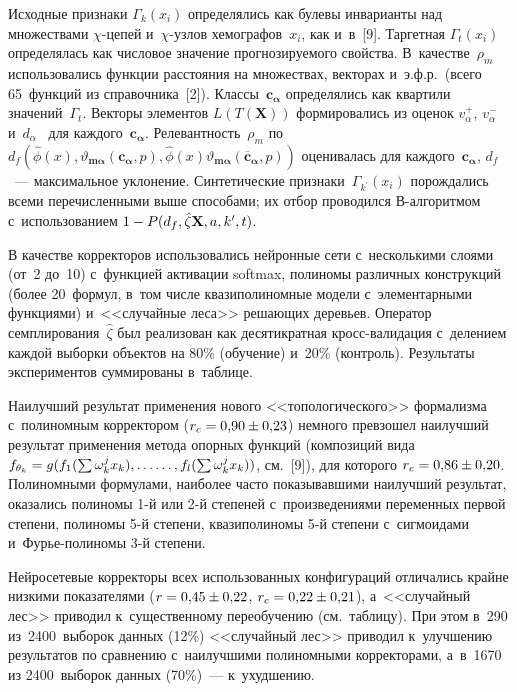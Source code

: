 \begin{multicols}{2}
     Исходные признаки $\Gamma_k(x_i)$ определялись как булевы 
инварианты над множествами $\chi$-це\-пей и~$\chi$-уз\-лов 
хемографов~$x_i$, как и~в~[9]. Таргетная $\Gamma_t(x_i)$ определялась как 
числовое значение прогнозируемого свойства. В~качестве~$\rho_m$ 
использовались функции расстояния на множествах, векторах и~э.ф.р.\ (всего 
65~функций из справочника~[2]). Классы~$\mathbf{c}_{\bm{\alpha}}$ 
определялись как квартили значений~$\Gamma_t$. Векторы элементов 
$L(T(\mathbf{X}))$ формировались из оценок $v^+_\alpha$, $v^-_\alpha$ 
и~$d_\alpha$~\cite{4-tor} для каждого~$\mathbf{c}_{\bm{\alpha}}$. 
Релевантность~$\rho_m$ по $d_f(\hat{\phi}(x),\vartheta_{\mathbf{m}{\bm 
\alpha}}(\mathbf{c}_{\bm{\alpha}},{p}), 
\hat{\phi}(x)\vartheta_{\mathbf{m}{\bm \alpha}} 
(\overline{\mathbf{c}}_{\bm{\alpha}}, {p}))$ оценивалась для 
каждого~$\mathbf{c}_{\bm{\alpha}}$, $d_f$~--- максимальное уклонение. 
Синтетические признаки~$\Gamma_{k^\prime}(x_i)$ по\-рож\-да\-лись всеми 
перечисленными выше способами; их отбор проводился В-ал\-го\-рит\-мом 
с~использованием $1\hm- {P}(d_f, \hat{\zeta}\mathbf{X}, a, 
     k^\prime, t)$. 
     
     В качестве корректоров использовались нейронные сети с~несколькими 
слоями (от~2 до~10) с~функцией активации softmax, полиномы различных 
конструкций (более 20~формул, в~том числе квазиполиномные модели 
с~элементарными функциями) и~<<случайные леса>> решающих деревьев. 
Оператор семплирования~$\hat{\zeta}$ был реализован как десятикратная  
кросс-ва\-ли\-да\-ция с~делением каждой выборки объектов на 80\% 
(обучение) и~20\% (конт\-роль). Результаты экспериментов суммированы 
в~таблице.
     

     
     Наилучший результат применения нового <<топологического>> 
формализма с~полиномным корректором ($r_c\hm=0{,}90\hm\pm0{,}23$) 
немного превзошел наилучший результат применения \mbox{метода} опорных 
функций (композиций вида $f_{\theta_k} \hm= g(f_1(\sum \omega_k^j x_k), 
\ldots\linebreak \ldots , f_l(\sum \omega_k^j x_k))$, см.~[9]), для которого 
$r_c\hm=0{,}86\hm\pm0{,}20$. Полиномными формулами, наиболее часто 
показывавшими наилучший результат, оказались полиномы 1-й или 2-й 
степеней с~произведениями переменных первой степени, полиномы 5-й 
степени, квазиполиномы 5-й степени с~сигмоидами и~Фурье-по\-ли\-но\-мы  
3-й степени.
     
     Нейросетевые корректоры всех использованных конфигураций 
отличались крайне низкими показателями ($r\hm=0{,}45\hm\pm0{,}22$, 
$r_c\hm=0{,}22\hm\pm0{,}21$), а~<<случайный лес>> приводил 
к~существенному переобучению (см.\ таб\-ли\-цу). При этом в~290 
из~2400~выборок данных (12\%) <<случайный лес>> приводил к~улучшению 
результатов по сравнению с~наилучшими полиномными корректорами, 
а~в~1670 из 2400~выборок данных (70\%)~--- к~ухудшению.
     

\end{multicols}
